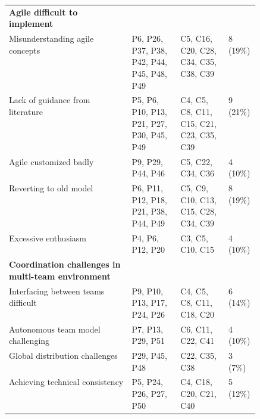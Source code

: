 \begin{table}[tbp]
\begin{centering}
\begin{tabularx}{\linewidth}{>{\raggedright\arraybackslash}p{0.49\linewidth}X}
        \midrule
        \textbf{Agile difficult to implement}       \\ \addlinespace
        Misunderstanding agile concepts             & P6, P26, P37, P38, P42, P44, P45, P48, P49  & C5, C16, C20, C28, C34, C35, C38, C39    & 8 (19\%) \\ \addlinespace
        Lack of guidance from literature            & P5, P6, P10, P13, P21, P27, P30, P45, P49   & C4, C5, C8, C11, C15, C21, C23, C35, C39 & 9 (21\%) \\ \addlinespace
        Agile customized badly                      & P9, P29, P44, P46                           & C5, C22, C34, C36                        & 4 (10\%) \\ \addlinespace
        Reverting to old model                      & P6, P11, P12, P18, P21, P38, P44, P49       & C5, C9, C10, C13, C15, C28, C34, C39     & 8 (19\%) \\ \addlinespace
        Excessive enthusiasm                        & P4, P6, P12, P20                            & C3, C5, C10, C15                         & 4 (10\%) \\

	\midrule
        {\textbf{Coordination challenges in multi-team environment}}  \\ \addlinespace
        Interfacing between teams difficult         & P9, P10, P13, P17, P24, P26               & C4, C5, C8, C11, C18, C20       & 6 (14\%) \\ \addlinespace	
        Autonomous team model challenging           & P7, P13, P29, P51                         & C6, C11, C22, C41               & 4 (10\%) \\ \addlinespace
        Global distribution challenges              & P29, P45, P48                             & C22, C35, C38                   & 3 (7\%)  \\ \addlinespace
        Achieving technical consistency             & P5, P24, P26, P27, P50                    & C4, C18, C20, C21, C40          & 5 (12\%) \\


\end{tabularx}
\end{centering}
\end{table}
